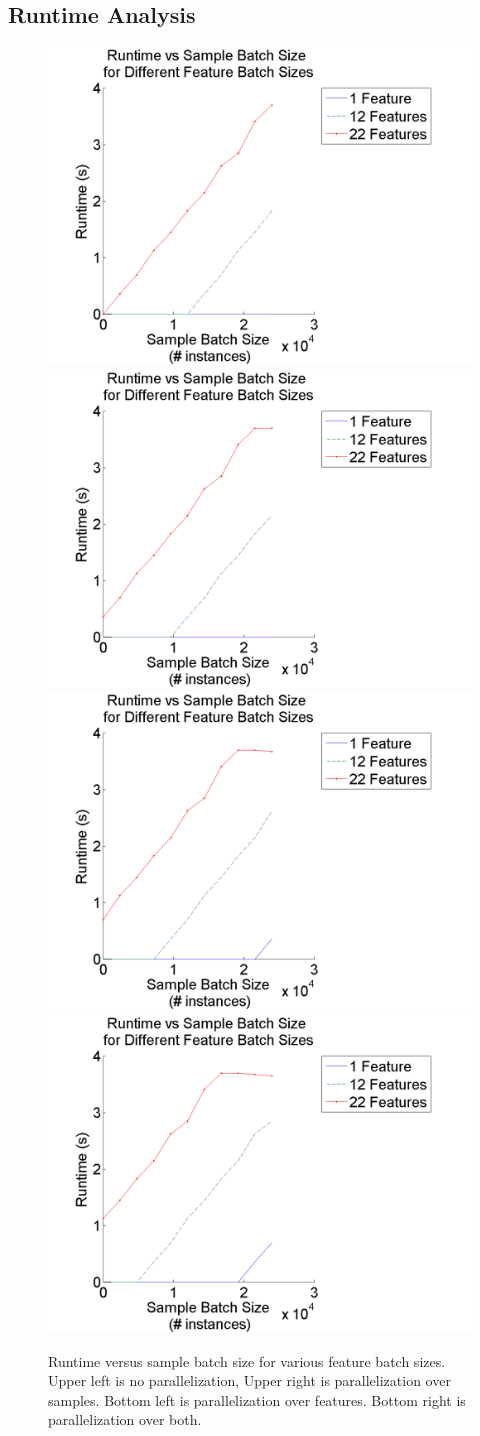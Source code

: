 \documentclass{article}
\begin{document}
\subsection{Runtime Analysis}
\begin{figure}
\centering
\includegraphics[width = .4\linewidth]{samptimeplot5}
\includegraphics[width = .4\linewidth]{samptimeplot7}
\includegraphics[width = .4\linewidth]{samptimeplot9}
\includegraphics[width = .4\linewidth]{samptimeplot11}
\caption{Runtime versus sample batch size for various feature batch sizes. Upper left is no parallelization, Upper right is parallelization over samples. Bottom left is parallelization over features. Bottom right is parallelization over both.}
\end{figure}
\end{document}
